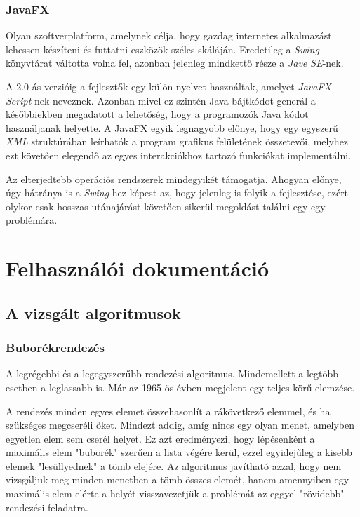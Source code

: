 \documentclass{elteikthesis}
\begin{document}
\subsection{JavaFX}
Olyan szoftverplatform, amelynek célja, hogy gazdag internetes alkalmazást lehessen készíteni és futtatni eszközök széles skáláján. Eredetileg a \emph{Swing} könyvtárat váltotta volna fel, azonban jelenleg mindkettő része a \emph{Jave SE}-nek. \par
 A 2.0-ás verzióig a fejlesztők egy külön nyelvet használtak, amelyet \emph{JavaFX Script}-nek neveznek. Azonban mivel ez szintén Java bájtkódot generál a későbbiekben megadatott a lehetőség, hogy a programozók Java kódot használjanak helyette. A JavaFX egyik legnagyobb előnye, hogy egy egyszerű \emph{XML} struktúrában leírhatók a program grafikus felületének összetevői, melyhez ezt követően elegendő az egyes interakciókhoz tartozó funkciókat implementálni.\par Az elterjedtebb operációs rendszerek mindegyikét támogatja. Ahogyan előnye, úgy hátránya is a \emph{Swing}-hez képest az, hogy jelenleg is folyik a fejlesztése, ezért olykor csak hosszas utánajárást követően sikerül megoldást találni egy-egy problémára.

\chapter{Felhasználói dokumentáció}

\section{A vizsgált algoritmusok}

\subsection{Buborékrendezés}
A legrégebbi és a legegyszerűbb rendezési algoritmus. Mindemellett a legtöbb esetben a leglassabb is. Már az 1965-ös évben megjelent egy teljes körű elemzése\cite{Demuth}.\par
 A rendezés minden egyes elemet összehasonlít a rákövetkező elemmel, és ha szükséges megcseréli őket. Mindezt addig, amíg nincs egy olyan menet, amelyben egyetlen elem sem cserél helyet. Ez azt eredményezi, hogy lépésenként a maximális elem "buborék" szerűen a lista végére kerül, ezzel egyidejűleg a kisebb elemek "lesüllyednek" a tömb elejére. Az algoritmus javítható azzal, hogy nem vizsgáljuk meg minden menetben a tömb összes elemét, hanem amennyiben egy maximális elem elérte a helyét visszavezetjük a problémát az eggyel "rövidebb" rendezési feladatra\cite{Fekete}.
\end{document}
